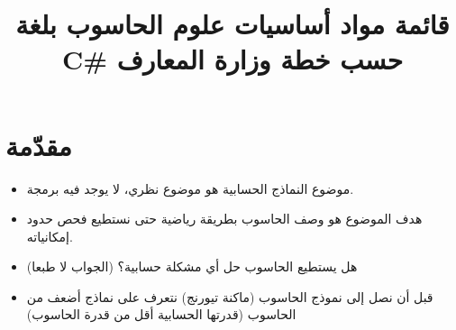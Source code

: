 \documentclass[12pt]{article}
\title{قائمة مواد أساسيات علوم الحاسوب بلغة C\# حسب خطة وزارة المعارف}
\begin{document}
\maketitle
\renewcommand{\contentsname}{جدول المحتويات}
\tableofcontents
\clearpage

\section{مقدّمة}

\begin{itemize}
    \item موضوع النماذج الحسابية هو موضوع نظري، لا يوجد فيه برمجة.
    \item هدف الموضوع هو وصف الحاسوب بطريقة رياضية حتى نستطيع فحص حدود إمكانياته.
    \item هل يستطيع الحاسوب حل أي مشكلة حسابية؟ (الجواب لا طبعا)
    \item قبل أن نصل إلى نموذج الحاسوب (ماكنة تيورنج) نتعرف على نماذج أضعف من الحاسوب (قدرتها الحسابية أقل من قدرة الحاسوب)
\end{itemize}
\end{document}
